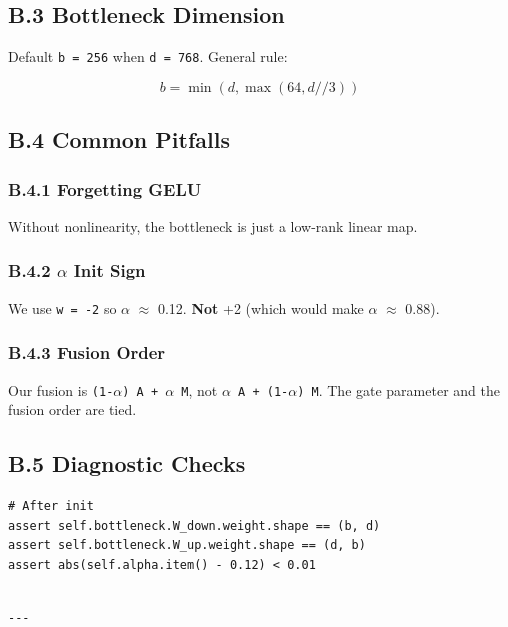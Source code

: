 \subsection{B.3 Bottleneck Dimension}

Default \texttt{b = 256} when \texttt{d = 768}. General rule:

\[
b = \min(d, \max(64, d // 3))
\tag{B.1}
\]

\subsection{B.4 Common Pitfalls}

\subsubsection{B.4.1 Forgetting GELU}

Without nonlinearity, the bottleneck is just a low-rank linear map.

\subsubsection{B.4.2 $\alpha$ Init Sign}

We use \texttt{w  = -2} so $\alpha$  $\approx$ 0.12. \textbf{Not} +2 (which would make $\alpha$ $\approx$ 0.88).

\subsubsection{B.4.3 Fusion Order}

Our fusion is \texttt{(1-$\alpha$) A + $\alpha$ M}, not \texttt{$\alpha$ A + (1-$\alpha$) M}. The gate parameter 
and the fusion order are tied.

\subsection{B.5 Diagnostic Checks}

\begin{lstlisting}
# After init
assert self.bottleneck.W_down.weight.shape == (b, d)
assert self.bottleneck.W_up.weight.shape == (d, b)
assert abs(self.alpha.item() - 0.12) < 0.01
\end{lstlisting}
\begin{lstlisting}

---
\end{lstlisting}
